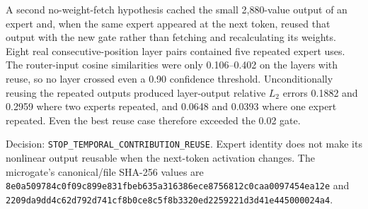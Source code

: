 A second no-weight-fetch hypothesis cached the small 2,880-value output of an
expert and, when the same expert appeared at the next token, reused that output
with the new gate rather than fetching and recalculating its weights.  Eight
real consecutive-position layer pairs contained five repeated expert uses.
The router-input cosine similarities were only 0.106--0.402 on the layers with
reuse, so no layer crossed even a 0.90 confidence threshold.  Unconditionally
reusing the repeated outputs produced layer-output relative $L_2$ errors
0.1882 and 0.2959 where two experts repeated, and 0.0648 and 0.0393 where one
expert repeated.  Even the best reuse case therefore exceeded the 0.02 gate.

Decision: \texttt{STOP\_TEMPORAL\_CONTRIBUTION\_REUSE}.  Expert identity does
not make its nonlinear output reusable when the next-token activation changes.
The microgate's canonical/file SHA-256 values are
\texttt{8e0a509784c0f09c899e831fbeb635a316386ece8756812c0caa0097454ea12e}
and
\texttt{2209da9dd4c62d792d741cf8b0ce8c5f8b3320ed2259221d3d41e445000024a4}.
